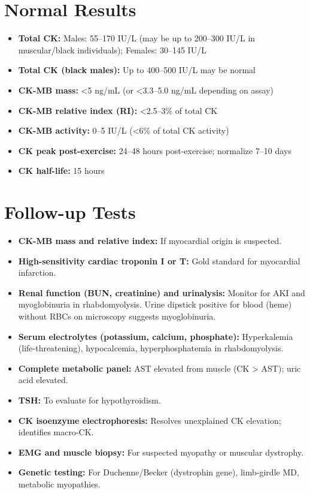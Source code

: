 \section*{Normal Results}
\begin{itemize}
  \item \textbf{Total CK:} Males: 55--170 IU/L (may be up to 200--300 IU/L in muscular/black individuals); Females: 30--145 IU/L
  \item \textbf{Total CK (black males):} Up to 400--500 IU/L may be normal
  \item \textbf{CK-MB mass:} <5 ng/mL (or <3.3--5.0 ng/mL depending on assay)
  \item \textbf{CK-MB relative index (RI):} <2.5--3\% of total CK
  \item \textbf{CK-MB activity:} 0--5 IU/L (<6\% of total CK activity)
  \item \textbf{CK peak post-exercise:} 24--48 hours post-exercise; normalize 7--10 days
  \item \textbf{CK half-life:} 15 hours
\end{itemize}

\section*{Follow-up Tests}
\begin{itemize}
  \item \textbf{CK-MB mass and relative index:} If myocardial origin is suspected.
  \item \textbf{High-sensitivity cardiac troponin I or T:} Gold standard for myocardial infarction.
  \item \textbf{Renal function (BUN, creatinine) and urinalysis:} Monitor for AKI and myoglobinuria in rhabdomyolysis. Urine dipstick positive for blood (heme) without RBCs on microscopy suggests myoglobinuria.
  \item \textbf{Serum electrolytes (potassium, calcium, phosphate):} Hyperkalemia (life-threatening), hypocalcemia, hyperphosphatemia in rhabdomyolysis.
  \item \textbf{Complete metabolic panel:} AST elevated from muscle (CK > AST); uric acid elevated.
  \item \textbf{TSH:} To evaluate for hypothyroidism.
  \item \textbf{CK isoenzyme electrophoresis:} Resolves unexplained CK elevation; identifies macro-CK.
  \item \textbf{EMG and muscle biopsy:} For suspected myopathy or muscular dystrophy.
  \item \textbf{Genetic testing:} For Duchenne/Becker (dystrophin gene), limb-girdle MD, metabolic myopathies.
\end{itemize}

